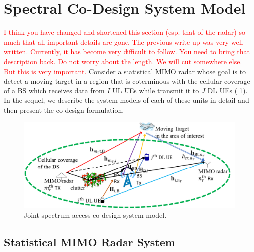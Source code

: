 \documentclass[9pt,journal]{IEEEtran}
\theoremstyle{definition}
\begin{document}
\section{Spectral Co-Design System Model}
\label{sec:system}
\textcolor{red}{I think you have changed and shortened this section (esp. that of the radar) so much that all important details are gone. The previous write-up was very well-written. Currently, it has become very difficult to follow. You need to bring that description back. Do not worry about the length. We will cut somewhere else. But this is very important.}
Consider a statistical MIMO radar whose goal is to detect a moving target in a region that is coterminous with the cellular coverage of a BS which receives data from $\mathit{I}$ UL UEs while transmit it to $\mathit{J}$ DL UEs (\figurename{$\;$\ref{fig:setup}}). In the sequel, we describe the system models of each of these units in detail and then present the co-design formulation.
 \begin{figure}[t]
	\label{fig:setup}
	\centering
	\includegraphics[width=1\columnwidth]{setup_model_tsp.png}
	\caption{Joint spectrum access co-design system model.}
	\vspace{-1em}
\end{figure}
\subsection{Statistical MIMO Radar System}
\end{document}
